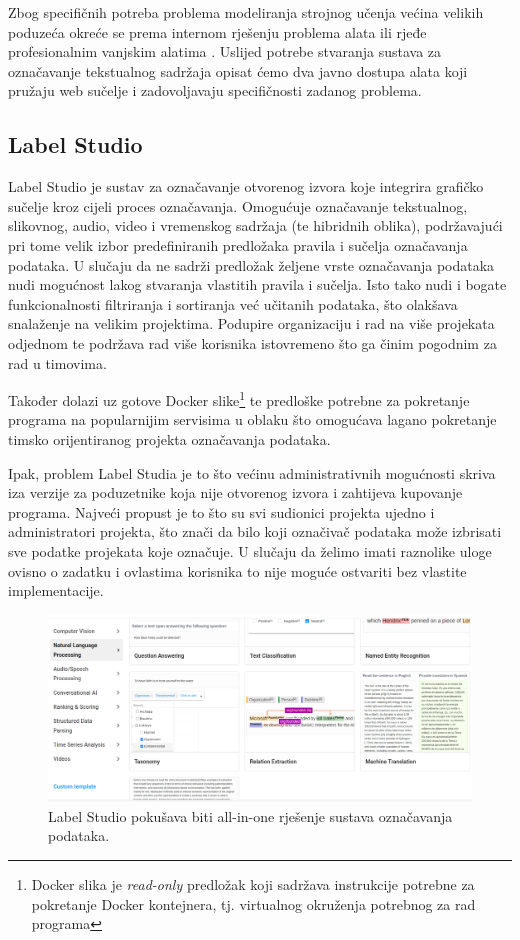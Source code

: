 \documentclass[times, utf8, zavrsni, numeric]{fer}
\begin{document}
Zbog specifičnih potreba problema modeliranja strojnog učenja većina velikih poduzeća okreće se prema internom rješenju problema alata ili rjeđe profesionalnim vanjskim alatima \citep{cognilytica2019}.
Uslijed potrebe stvaranja sustava za označavanje tekstualnog sadržaja opisat ćemo dva javno dostupa alata koji pružaju web sučelje i zadovoljavaju specifičnosti zadanog problema.

\subsection{Label Studio}

Label Studio je sustav za označavanje otvorenog izvora koje integrira grafičko sučelje kroz cijeli proces označavanja. 
Omogućuje označavanje tekstualnog, slikovnog, audio, video i vremenskog sadržaja (te hibridnih oblika), podržavajući pri tome velik izbor predefiniranih predložaka pravila i sučelja označavanja podataka. U slučaju da ne sadrži predložak željene vrste označavanja podataka nudi mogućnost lakog stvaranja vlastitih pravila i sučelja. Isto tako nudi i bogate funkcionalnosti filtriranja i sortiranja već učitanih podataka, što olakšava snalaženje na velikim projektima.
Podupire organizaciju i rad na više projekata odjednom te podržava rad više korisnika istovremeno što ga činim pogodnim za rad u timovima.

Također dolazi uz gotove Docker slike\footnote{Docker slika je \textit{read-only} predložak koji sadržava instrukcije potrebne za pokretanje Docker kontejnera, tj. virtualnog okruženja potrebnog za rad programa} te predloške potrebne za pokretanje programa na popularnijim servisima u oblaku što omogućava lagano pokretanje timsko orijentiranog projekta označavanja podataka.

Ipak, problem Label Studia je to što većinu administrativnih mogućnosti skriva iza verzije za poduzetnike koja nije otvorenog izvora i zahtijeva kupovanje programa. Najveći propust je to što su svi sudionici projekta ujedno i administratori projekta, što znači da bilo koji označivač podataka može izbrisati sve podatke projekata koje označuje.
U slučaju da želimo imati raznolike uloge ovisno o zadatku i ovlastima korisnika to nije moguće ostvariti bez vlastite implementacije. \citep{label_studio_docs} \citep{label_studio_github}

\begin{figure}[H]
\centering
\includegraphics[width=\textwidth]{pictures/label_studio_types.png}
\caption{Label Studio pokušava biti \glqq{}all-in-one\grqq{} rješenje sustava označavanja podataka.}
\label{label_studio_types}
\end{figure}
\end{document}
